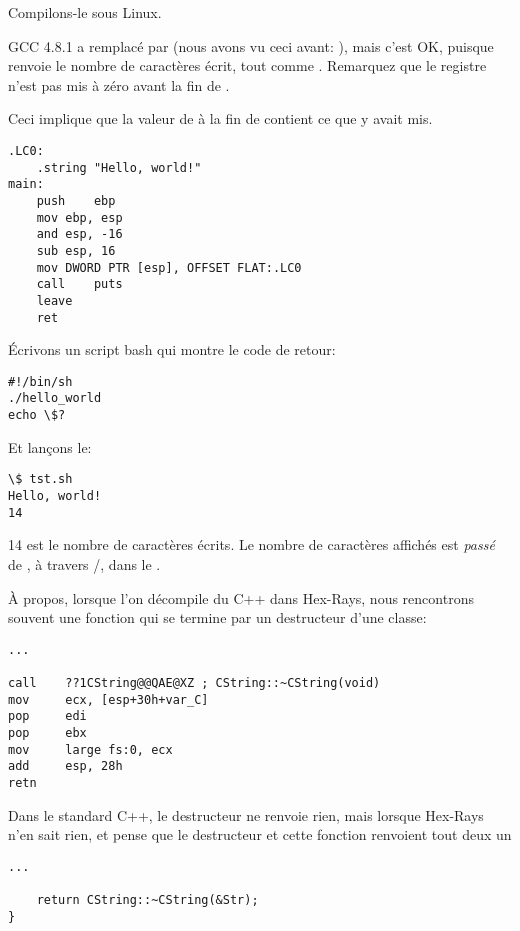 Compilons-le sous Linux.

GCC 4.8.1 a remplacé \printf par \puts (nous avons vu ceci avant: ),
mais c'est OK, puisque \puts renvoie le nombre de caractères écrit, tout comme
\printf.
Remarquez que le registre \EAX n'est pas mis à zéro avant la fin de \main.

Ceci implique que la valeur de \EAX à la fin de \main contient ce que \puts y avait mis.

\begin{lstlisting}[caption=GCC 4.8.1,style=customasmx86]
.LC0:
	.string	"Hello, world!"
main:
	push	ebp
	mov	ebp, esp
	and	esp, -16
	sub	esp, 16
	mov	DWORD PTR [esp], OFFSET FLAT:.LC0
	call	puts
	leave
	ret
\end{lstlisting}


Écrivons un script bash qui montre le code de retour:

\begin{lstlisting}[caption=tst.sh]
#!/bin/sh
./hello_world
echo \$?
\end{lstlisting}

Et lançons le:

\begin{lstlisting}
\$ tst.sh 
Hello, world!
14
\end{lstlisting}

14 est le nombre de caractères écrits.
Le nombre de caractères affichés est \textit{passé} de \printf{}, à travers /, dans le .

À propos, lorsque l'on décompile du C++ dans Hex-Rays, nous rencontrons souvent
une fonction qui se termine par un destructeur d'une classe:

\begin{lstlisting}[style=customasmx86]
...

call    ??1CString@@QAE@XZ ; CString::~CString(void)
mov     ecx, [esp+30h+var_C]
pop     edi
pop     ebx
mov     large fs:0, ecx
add     esp, 28h
retn
\end{lstlisting}

Dans le standard C++, le destructeur ne renvoie rien, mais lorsque Hex-Rays n'en %
sait rien, et pense que le destructeur et cette fonction renvoient tout deux un \Tint

\begin{lstlisting}[style=customc]
...

	return CString::~CString(&Str);
}
\end{lstlisting}

